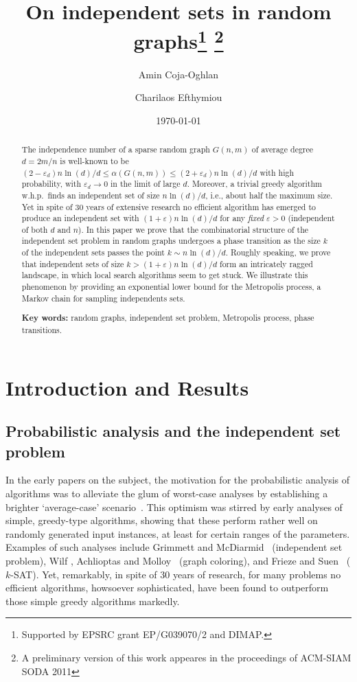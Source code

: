 \documentclass[a4paper,10pt]{article}
\date{\today}
\title{\bf On independent sets in random 
graphs\thanks{Supported by EPSRC grant EP/G039070/2 and DIMAP.} 
\thanks{A preliminary version of this work appeares in the proceedings of
ACM-SIAM SODA 2011}}
\author[1]{Amin Coja-Oghlan}
\author[2]{Charilaos Efthymiou}
\affil[1]{Goethe University, Mathematics Dept., Frankfurt 60054, Germany\\
\texttt{acoghlan@math.uni-frankfurt.de}}
\affil[2]{University of Warwick, Mathematics and Computer Science, Coventry CV4 7AL, UK\\
\texttt{c.efthymiou@warwick.ac.uk}}
\newcommand\eps{\varepsilon}
\newcommand\ra{\rightarrow}
\newcommand{\whp}{w.h.p.}
\begin{document}
\maketitle
\thispagestyle{empty}




\begin{abstract}
The independence number of a sparse random graph $G(n,m)$ of average degree $d=2m/n$ is well-known to be
	$(2-\eps_d)n\ln(d)/d\leq\alpha(G(n,m))\leq(2+\eps_d)n\ln(d)/d$ with high probability,
		with $\eps_d\ra0$ in the limit of large $d$.
Moreover, a trivial greedy algorithm \whp\ finds an independent set of size $n\ln(d)/d$, i.e.,
about half the maximum size.
Yet in spite of 30 years of extensive research no efficient algorithm has emerged to
produce an independent set with $(1+\eps)n\ln(d)/d$ for any \emph{fixed} $\eps>0$ (independent of both $d$ and $n$).
In this paper we prove that the combinatorial structure of the independent set problem in random
graphs undergoes a phase transition as the size $k$ of the independent sets passes
the point $k\sim n\ln(d)/d$.
Roughly speaking, we prove that independent sets of size $k>(1+\eps)n\ln(d)/d$ form an 
intricately ragged landscape, in which local search algorithms seem to get stuck.
We illustrate this phenomenon by providing an exponential lower bound for the Metropolis
process, a Markov chain for sampling independents sets.

\medskip
\noindent
{\bf Key words:}
random graphs, independent set problem, Metropolis process, phase transitions.
\end{abstract}

\setcounter{page}{1}
\section{Introduction and Results}
\subsection{Probabilistic analysis  and the independent set problem}

In the early papers on the subject, the motivation for the probabilistic
analysis of algorithms was to alleviate the glum of worst-case
analyses by establishing a brighter `average-case' scenario~\cite{AverAlg1,AverAlg2,AverAlg3}.
This optimism was stirred by early analyses of simple, greedy-type
algorithms, showing that these perform rather well on randomly
generated input instances, at least for certain ranges of the
parameters. Examples of such analyses include Grimmett and
McDiarmid~\cite{grimmett} (independent set problem), Wilf
\cite{Wilf}, Achlioptas and Molloy~\cite{AchListColouring} 
(graph coloring), and Frieze and Suen~\cite{FrSu} ($k$-SAT). Yet, remarkably, in spite of 30
years of research, for many problems no efficient algorithms,
howsoever sophisticated, have been found to outperform those simple
greedy algorithms markedly.
\end{document}
